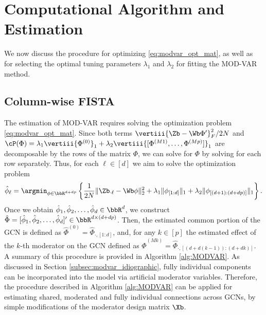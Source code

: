 \section{Computational Algorithm and Estimation}\label{section:computation}

We now discuss the procedure for optimizing \eqref{eq:modvar_opt_mat}, as well as for selecting the optimal tuning parameters $\lambda_1$ and $\lambda_2$ for fitting the MOD-VAR method. 

\subsection{Column-wise FISTA}

The estimation of MOD-VAR requires solving the optimization problem \eqref{eq:modvar_opt_mat}. Since both terms $\vertiii{\Zb - \Wb \Phi'}_F^2 / 2N$ and $\cP(\Phi) = \lambda_1 \vertiii{\Phi^{(0)}}_1 + \lambda_2 \vertiii{[\Phi^{(M1)},\ldots , \Phi^{(Mp)}]}_1$ are decomposable by the rows of the matrix $\Phi$, we can solve for $\Phi$ by solving for each row separately. Thus, for each $\ell \in[d]$ we aim to solve the optimization problem
\begin{equation}\label{eq:modvar_lasso_columnwise}
	\hat\phi_\ell = \argmin_{\phi\in\bbR^{d+dp}} \left\{\frac{1}{2N} \| \Zb_{\cdot \ell}  - \Wb \phi\|_2^2 + \lambda_1 \|\phi_{[1:d]}\|_1 + \lambda_2 \|\phi_{[(d+1):(d+ dp)]}\|_1 \right\}.
\end{equation}
Once we obtain $\hat\phi_1,\hat\phi_2,\ldots, \hat\phi_d\in\bbR^{d}$, we construct $\hat\Phi = [\hat\phi_1,\hat\phi_2,\ldots, \hat\phi_d]'\in\bbR^{d\times (d+dp)}$. Then, the estimated common portion of the GCN is defined as $\hat\Phi^{(0)} = \hat\Phi_{\cdot, [1:d]}$, and, for any $k\in[p]$ the estimated effect of the $k$-th moderator on the GCN defined as $\hat\Phi^{(M k)} = \hat\Phi_{\cdot, [(d+ d(k-1)):(d+dk)]}$. A summary of this procedure is provided in Algorithm \ref{alg:MODVAR}. As discussed in Section \ref{subsec:modvar_idiographic}, fully individual components can be incorporated into the model via artificial moderator variables. Therefore, the procedure described in Algorithm \ref{alg:MODVAR} can be applied for estimating shared, moderated and fully individual connections across GCNs, by simple modifications of the moderator design matrix $\Xb$. 

